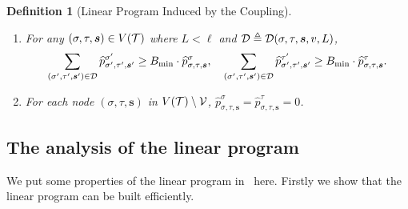 \documentclass[11pt]{article}
\newtheorem{lemma}[theorem]{Lemma}
\newtheorem{definition}[theorem]{Definition}
\def\!#1{\mathtt{#1}}
\newcommand{\seqS}{\boldsymbol{s}}
\newcommand{\qgl}[1]{{\color{purple}{#1}}}
\begin{document}
\begin{definition}[Linear Program Induced by the Coupling]
{\begin{enumerate}
\begin{align}
            \end{align}
        \item For any $(\sigma,\tau, \seqS)\in V(\+T)$ where $L< \ell$ and $\+D \triangleq \+D(\sigma,\tau, \seqS,v,L)$,
           \begin{align}\label{eqn-hat-error-bound}
               \sum_{(\sigma',\tau',\seqS')\in \+D}\widehat{p}^{\sigma'}_{\sigma',\tau', \seqS'} \geq  B_{\min} \cdot \widehat{p}^{\sigma}_{\sigma,\tau, \seqS}, \quad \sum_{(\sigma',\tau',\seqS')\in \+D}\widehat{p}^{\tau'}_{\sigma',\tau',\seqS'}\geq  B_{\min} \cdot \widehat{p}^{\tau}_{\sigma,\tau,\seqS}.
           \end{align}
        \item  For each node $(\sigma, \tau, \seqS)$ in $V(\mathcal{T})\setminus \mathcal{V}$, $ \widehat{p}^{\sigma}_{\sigma,\tau, \seqS}= \widehat{p}^{\tau}_{\sigma,\tau, \seqS}=0$. 
    \end{enumerate}
}
\end{definition}


\subsection{The analysis of the linear program}

We put some properties of the linear program in~ here. Firstly we show that the linear program can be built efficiently.
\end{document}
